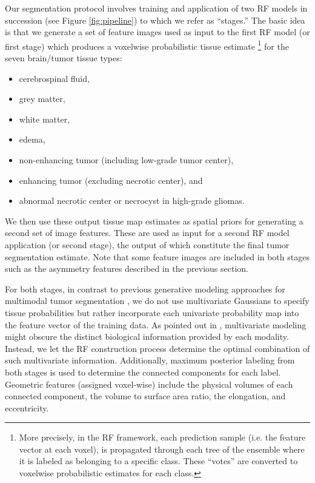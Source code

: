 \documentclass[preprint,authoryear,review,12pt]{elsarticle}
\begin{document}
Our segmentation protocol involves training and application
of two RF models in succession 
(see Figure \ref{fig:pipeline}) to which we refer as ``stages.''  The basic idea is that
we generate a set of feature images used as input to the
first RF model (or first stage) which produces a voxelwise 
probabilistic tissue estimate%
\footnote{
More precisely, in the RF framework, each prediction sample (i.e. the feature vector at each voxel),
is propagated through each tree of the ensemble where it is labeled as belonging to a specific
class.  These ``votes'' are converted to voxelwise probabilistic estimates for each class.
}
 for the seven brain/tumor tissue types:
\begin{itemize}
\item cerebrospinal fluid,
\item grey matter,
\item white matter,
\item edema, 
\item non-enhancing tumor (including low-grade tumor center), 
\item enhancing tumor (excluding necrotic center), and 
\item abnormal necrotic center or necrocyst in high-grade gliomas.
\end{itemize}
We then use these output tissue map estimates as spatial 
priors for generating a second set of image features.  These
are used as input for a second RF model application (or
second stage),
the output of which constitute the final tumor segmentation estimate.
Note that some feature images are included in both stages such as
the asymmetry features described in the previous section.

For both stages, in contrast to previous generative
modeling approaches for multimodal tumor segmentation 
\citep[e.g.,][]{prastawa2003}, we do not use multivariate 
Gaussians to specify tissue probabilities but rather incorporate each
univariate probability map into the feature vector of the training
data.  As pointed out in \cite{menze2010}, multivariate modeling
might obscure the distinct biological information provided by each 
modality.  Instead, we let the RF construction 
process determine the optimal combination of such multivariate
information.  Additionally, maximum posterior labeling from both stages
is used to determine the connected components for each label.  
Geometric features (assigned voxel-wise) include the physical volumes 
of each connected component, the volume to surface area ratio, 
the elongation, and eccentricity. 
\end{document}
